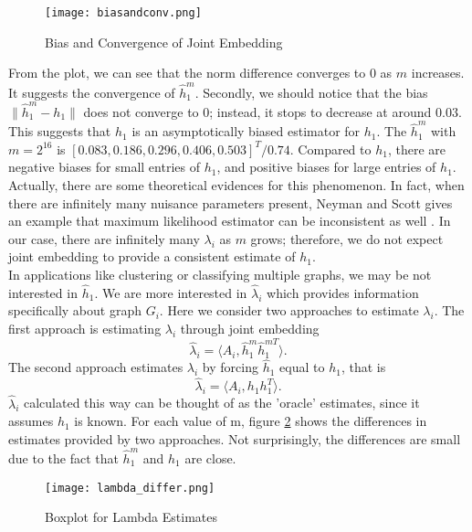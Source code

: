 \documentclass[10pt,journal,compsoc]{IEEEtran}
\begin{document}
\begin{figure}[!htbp]
	\centering
	\texttt{[image: biasandconv.png]}
	\caption{Bias and Convergence of Joint Embedding}
	\label{fig:db}
\end{figure}

\noindent From the plot, we can see that the norm difference converges to $0$ as $m$ increases. It suggests the convergence of $\hat{h}_1^m$. Secondly, we should notice that the bias $\|\hat{h}^m_1-h_1\|$ does not converge to $0$; instead, it stops to decrease at around $0.03$. This suggests that $\hat{h}_1$ is an asymptotically biased estimator for $h_1$. The $\hat{h}_1^m$ with $m=2^{16}$ is $[0.083,0.186, 0.296, 0.406, 0.503]^T/0.74$. Compared to $h_1$, there are negative biases for small entries of $h_1$, and positive biases for large entries of $h_1$. Actually, there are some theoretical evidences for this phenomenon. In fact, when there are infinitely many nuisance parameters present, Neyman and Scott gives an example that maximum likelihood estimator can be inconsistent as well \cite{neyman1948consistent}. In our case, there are infinitely many $\lambda_i$ as $m$ grows; therefore, we do not expect joint embedding to provide a consistent estimate of $h_1$. \\

\noindent In applications like clustering or classifying multiple graphs, we may be not interested in $\hat{h}_1$. We are more interested in $\hat{\lambda}_i$ which provides information specifically about graph $G_i$. Here we consider two approaches to estimate $\lambda_i$. The first approach is estimating $\lambda_i$ through joint embedding
\[ \hat{\lambda}_i = \langle A_i,  \hat{h}^m_1 \hat{h}^{m T}_1 \rangle. \]
The second approach estimates $\lambda_i$ by forcing $\hat{h}_1$ equal to $h_1$, that is 
\[ \hat{\lambda}_i = \langle A_i,  h_1 h_1^T \rangle. \]
$\hat{\lambda}_i$ calculated this way can be thought of as the 'oracle' estimates, since it assumes $h_1$ is known. For each value of m, figure \ref{fig:ld} shows the differences in estimates provided by two approaches. Not surprisingly, the differences are small due to the fact that $\hat{h}_1^m$ and $h_1$ are close.
\begin{figure}[!htbp]
	\centering
	\texttt{[image: lambda\_differ.png]}
	\caption{Boxplot for Lambda Estimates}
	\label{fig:ld}
\end{figure}
\end{document}
